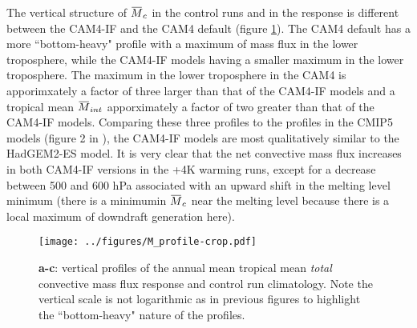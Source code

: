\documentclass[letterpaper,12pt,titlepage,oneside,final]{book}
\newcommand{\overbar}[1]{\mkern 1.5mu\overline{\mkern-1.5mu#1\mkern-1.5mu}\mkern 1.5mu}
\begin{document}
The vertical structure of $\overbar{M}_{c}$ in the control runs and in the response is different between the CAM4-IF and the CAM4 default (figure \ref{fig:mprofs}). The CAM4 default has a more ``bottom-heavy" profile with a maximum of mass flux in the lower troposphere, while the CAM4-IF models having a smaller maximum in the lower troposphere. The maximum in the lower troposphere in the CAM4 is apporimxately a factor of three larger than that of the CAM4-IF models and a tropical mean $\overbar{M}_{int}$ apporximately a factor of two greater than that of the CAM4-IF models. Comparing these three profiles to the profiles in the CMIP5 models (figure 2 in \cite{chadwick_spatial_2012}), the CAM4-IF models are most qualitatively similar to the HadGEM2-ES model. It is very clear that the net convective mass flux increases in both CAM4-IF versions in the +4K warming runs, except for a decrease between 500 and 600 hPa associated with an upward shift in the melting level minimum (there is a minimumin $\overbar{M}_{c}$ near the melting level because there is a local maximum of downdraft generation here).
\begin{figure}[t]
\centering
\noindent\texttt{[image: ../figures/M\_profile-crop.pdf]}\hfill
\caption{\footnotesize \footnotesize \textbf{a-c}: vertical profiles of the annual mean tropical mean \textit{total} convective mass flux response and control run climatology. Note the vertical scale is not logarithmic as in previous figures to highlight the ``bottom-heavy" nature of the profiles.}
\label{fig:mprofs}
\end{figure}
\end{document}
